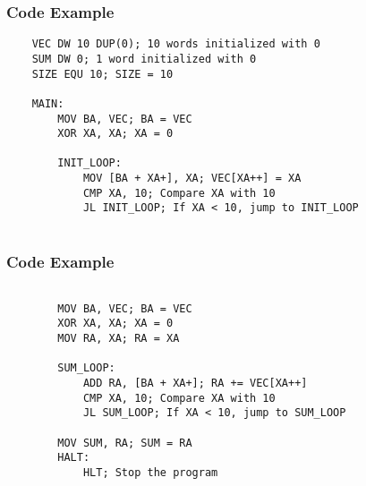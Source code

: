 \begin{frame}[fragile]
    \frametitle{Code Example}
    \begin{verbatim}
    VEC DW 10 DUP(0); 10 words initialized with 0
    SUM DW 0; 1 word initialized with 0
    SIZE EQU 10; SIZE = 10

    MAIN:
        MOV BA, VEC; BA = VEC
        XOR XA, XA; XA = 0

        INIT_LOOP:
            MOV [BA + XA+], XA; VEC[XA++] = XA
            CMP XA, 10; Compare XA with 10
            JL INIT_LOOP; If XA < 10, jump to INIT_LOOP
        
    \end{verbatim}
    
\end{frame}


\begin{frame}[fragile]
    \frametitle{Code Example}
    \begin{verbatim}
    
        MOV BA, VEC; BA = VEC
        XOR XA, XA; XA = 0
        MOV RA, XA; RA = XA

        SUM_LOOP:
            ADD RA, [BA + XA+]; RA += VEC[XA++]
            CMP XA, 10; Compare XA with 10
            JL SUM_LOOP; If XA < 10, jump to SUM_LOOP

        MOV SUM, RA; SUM = RA
        HALT:
            HLT; Stop the program
        
    \end{verbatim}
    
\end{frame}